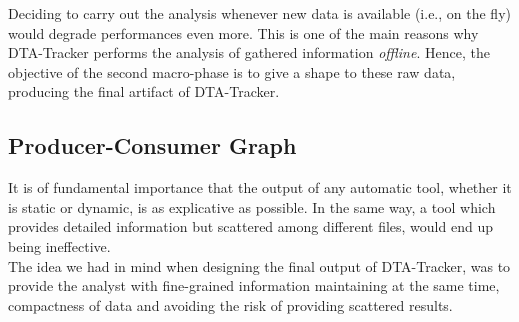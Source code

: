 \documentclass[LaM,binding=0.6cm]{sapthesis}
\begin{document}
Deciding to carry out the analysis whenever new data is available (i.e., on the fly) would degrade performances even more. This is one of the main reasons why {\sf DTA-Tracker} performs the analysis of gathered information {\em offline}. Hence, the objective of the second macro-phase is to give a shape to these raw data, producing the final artifact of {\sf DTA-Tracker}.

\subsection{Producer-Consumer Graph}
It is of fundamental importance that the output of any automatic tool, whether it is static or dynamic, is as explicative as possible. In the same way, a tool which provides detailed information but scattered among different files, would end up being ineffective.\\

The idea we had in mind when designing the final output of {\sf DTA-Tracker}, was to provide the analyst with fine-grained information maintaining at the same time, compactness of data and avoiding the risk of providing scattered results.
\end{document}
